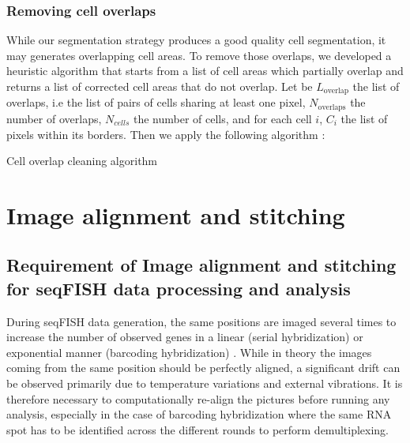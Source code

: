 \documentclass[12pt]{article}
\begin{document}
\subsubsection{Removing cell overlaps}

While our segmentation strategy produces a good quality cell segmentation, it may generates overlapping cell areas. To remove those overlaps, we developed a heuristic algorithm that starts from a list of cell areas which partially overlap and returns a list of corrected cell areas that do not overlap. 
Let be $L_{\text{overlap}}$ the list of overlaps, i.e the list of pairs of cells sharing at least one pixel, $N_{\text{overlaps}}$ the number of overlaps, $N_{cells}$ the number of cells, and for each cell $i$, $C_{i}$ the list of pixels within its borders. Then we apply the following algorithm :

 
 
\begin{algorithm}[H]
\DontPrintSemicolon
\SetAlgoLined
{}
\BlankLine
 
 
\caption{Cell overlap cleaning algorithm}
\end{algorithm}

\section{Image alignment and stitching}

\subsection{Requirement of Image alignment and stitching for seqFISH data processing and analysis}

During seqFISH data generation, the same positions are imaged several times to increase the number of observed genes in a linear (serial hybridization) or exponential manner (barcoding hybridization) \citep{chen_spatially_2015}. While in theory the images coming from the same position should be perfectly aligned, a significant drift can be observed primarily due to temperature variations and external vibrations. It is therefore necessary to computationally re-align the pictures before running any analysis, especially in the case of barcoding hybridization where the same RNA spot has to be identified across the different rounds to perform demultiplexing.
\end{document}
